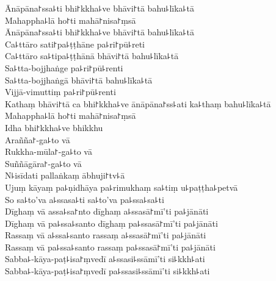 \documentclass[
  babelLanguage=english,
  final,
  webversion,
]{chantingbook}
\begin{document}
Ānāpāna꜓ssa꜕ti bhi꜓kkha꜕ve bhāvi꜓tā bahu꜕līka꜕tā\\
Mahappha꜕lā ho꜓ti mahā꜓nisa꜓ṃsā\\
Ānāpāna꜓ssa꜕ti bhi꜓kkha꜕ve bhāvi꜓tā bahu꜕līka꜕tā\\
Ca꜕ttāro sati꜓pa꜕ṭṭhāne pa꜕ri꜓pū꜕reti\\
Ca꜕ttāro sa꜕tipa꜕ṭṭhānā bhāvi꜓tā bahu꜕līka꜕tā\\
Sa꜕tta-bojjhaṅge pa꜕ri꜓pū꜕renti\\
Sa꜕tta-bojjhaṅgā bhāvi꜓tā bahu꜕līka꜕tā\\
Vijjā-vimuttiṃ pa꜕ri꜓pū꜕renti\\
Kathaṃ bhāvi꜓tā ca bhi꜓kkha꜕ve ānāpāna꜓ss꜕ati ka꜕thaṃ bahu꜕līka꜕tā\\
Mahappha꜕lā ho꜓ti mahā꜓nisa꜓ṃsā\\
Idha bhi꜓kkha꜕ve bhikkhu\\
Arañña꜓-ga꜕to vā\\
Rukkha-mūla꜓-ga꜕to vā\\
Suññāgāra꜓-ga꜕to vā\\
N꜕isīdati pallaṅkaṃ ābhuji꜓tv꜕ā\\
Ujuṃ kāyaṃ pa꜕ṇidhāya pa꜕rimukhaṃ sa꜕tiṃ u꜕paṭṭha꜕petvā\\
So sa꜕to'va a꜕ssasa꜕ti sa꜕to'va pa꜕ssa꜕sa꜕ti\\
Dīghaṃ vā assa꜕sa꜓nto dīghaṃ a꜕ssasā꜓mī'ti pa꜕jānāti\\
Dīghaṃ vā pa꜕ssa꜕santo dīghaṃ pa꜕ssasā꜓mī'ti pa꜕jānāti\\
Rassaṃ vā a꜕ssa꜕santo rassaṃ a꜕ssasā꜓mī'ti pa꜕jānāti\\
Rassaṃ vā pa꜕ssa꜕santo rassaṃ pa꜕ssasā꜓mī'ti pa꜕jānāti\\
Sabba꜕-kāya-paṭ꜕isa꜓ṃvedī a꜕ssasi꜕ssāmī'ti si꜕kkh꜕ati\\
Sabba꜕-kāya-paṭ꜕isa꜓ṃvedī pa꜕ssasi꜕ssāmī'ti si꜕kkh꜕ati

\clearpage

\enlargethispage{2\baselineskip}
\end{document}
